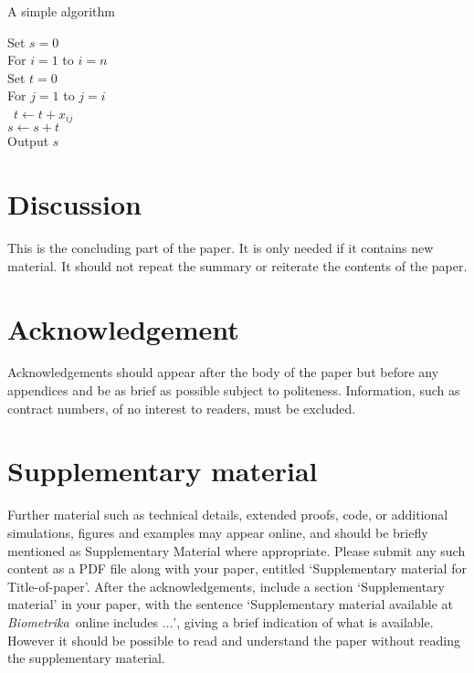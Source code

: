 \documentclass[article,lineno]{biometrika}
\def\Bka{{\it Biometrika}}
\begin{document}
\begin{algorithm}[!h]
\vspace*{-6pt}
\caption{A simple algorithm} \label{al1}
\vspace*{-10pt}
\begin{tabbing}
   \enspace Set $s=0$\\
   \enspace For $i=1$ to $i=n$ \\
   \qquad Set $t=0$\\
   \qquad For $j=1$ to $j=i$ \\\
  \qquad\qquad  $t \leftarrow t + x_{ij}$ \\
\qquad $s \leftarrow s + t$ \\
\enspace Output $s$
\end{tabbing}
\vspace*{-25pt}
\end{algorithm}

\section{Discussion}

This is the concluding part of the paper.  It is only needed if it contains new material.
It  should not repeat the summary or reiterate the contents of the paper.


\section*{Acknowledgement}
Acknowledgements should appear after the body of the paper but before any appendices and be as brief as possible
subject to politeness. Information, such as contract numbers, of no interest to readers, must
be excluded.

\section*{Supplementary material}
\label{SM}
Further material such as technical details, extended proofs, code, or additional  simulations, figures and examples may appear online, and should be briefly mentioned as Supplementary Material where appropriate.  Please submit any such content as a PDF file along with your paper, entitled `Supplementary material for Title-of-paper'.  After the acknowledgements, include a section `Supplementary material' in your paper, with the sentence `Supplementary material available at \Bka\ online includes $\ldots$', giving a brief indication of what is available.  However it should be possible to read and understand the paper without reading the supplementary material.
\end{document}
